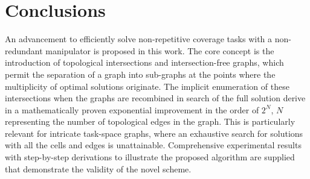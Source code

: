 \documentclass[journal]{IEEEtran}
\begin{document}
\section{Conclusions}
An advancement to efficiently solve non-repetitive coverage tasks with a non-redundant manipulator is proposed in this work. 
The core concept is the introduction of topological intersections and intersection-free graphs, which permit the separation of a graph 
into sub-graphs at the points where the multiplicity of optimal solutions originate. 
The implicit enumeration of these intersections when the graphs are recombined in search of the full solution derive in a mathematically proven exponential improvement in the order of $2^N$, $N$ representing the number of topological edges in the graph. This is particularly relevant for intricate task-space graphs,
where an exhaustive search for solutions with all the cells and edges is unattainable. 
Comprehensive experimental results with step-by-step derivations to illustrate the proposed algorithm are supplied that demonstrate the validity of the novel scheme. 
\label{section_conclusion}






\end{document}
